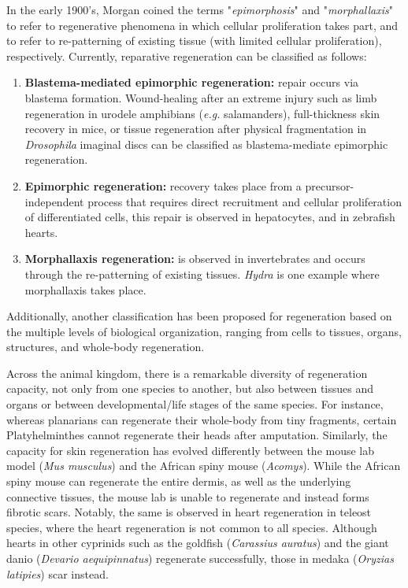 In the early 1900’s, Morgan coined the terms "\textit{epimorphosis}" and "\textit{morphallaxis}" to refer to regenerative phenomena in which cellular proliferation takes part, and to refer to re-patterning of existing tissue (with limited cellular proliferation), respectively.\autocite{morgan_1901_regeneration} Currently, reparative regeneration can be classified as follows: 

\begin{enumerate}
\item \textbf{Blastema-mediated epimorphic regeneration:} repair occurs via blastema formation. Wound-healing after an extreme injury such as limb regeneration in urodele amphibians (\textit{e.g.} salamanders), full-thickness skin recovery in mice, or tissue regeneration after physical fragmentation in \textit{Drosophila} imaginal discs can be classified as blastema-mediate epimorphic regeneration.\autocite{hariharan_2017_imaginal,iismaa_2018_comparative}
\item \textbf{Epimorphic regeneration:} recovery takes place from a precursor-independent process that requires direct recruitment and cellular proliferation of differentiated cells, this repair is observed in hepatocytes, and in zebrafish hearts.\autocite{gonzalez_2017_zebrafish_15,sergeeva_2020_liver_regeneration}
\item \textbf{Morphallaxis regeneration:} is observed in invertebrates and occurs through the re-patterning of existing tissues. \textit{Hydra} is one example where morphallaxis takes place.\autocite{vizcaya_2020_chromatin}
\end{enumerate}  

Additionally, another classification has been proposed for regeneration based on the multiple levels of biological organization, ranging from cells to tissues, organs, structures, and whole-body regeneration.\autocite{bely_2010_evolution}

Across the animal kingdom, there is a remarkable diversity of regeneration capacity, not only from one species to another, but also between tissues and organs or between developmental/life stages of the same species. For instance, whereas planarians can regenerate their whole-body from tiny fragments, certain Platyhelminthes cannot regenerate their heads after amputation.\autocite{vizcaya_2020_chromatin} Similarly, the capacity for skin regeneration has evolved differently between the mouse lab model (\textit{Mus musculus}) and the African spiny mouse (\textit{Acomys}). While the African spiny mouse can regenerate the entire dermis, as well as the underlying connective tissues, the mouse lab is unable to regenerate and instead forms fibrotic scars.\autocite{vizcaya_2020_chromatin,chen_2017_regeneration_genetics} Notably, the same is observed in heart regeneration in teleost species, where the heart regeneration is not common to all species. Although hearts in other cyprinids such as the goldfish (\textit{Carassius auratus}) and the giant danio (\textit{Devario aequipinnatus}) regenerate successfully, those in medaka (\textit{Oryzias latipies}) scar instead.\autocite{chen_2017_regeneration_genetics}

